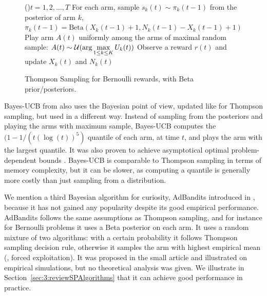 \begin{figure}[h!]
	\centering
    \begin{framed}
	\begin{algorithm}[H]
		\For(){$t = 1, 2, \dots, T$}{
            For each arm, sample $s_k(t) \sim \pi_k(t-1)$ from the posterior of arm $k$, $\pi_k(t-1)=\mathrm{Beta}(X_k(t-1)+1,N_k(t-1)-X_k(t-1)+1)$\;
            Play arm $A(t)$ uniformly among the arms of maximal random sample: $A(t) \sim \mathcal{U}(\arg\max\limits_{1\leq k \leq K} U_k(t))$\;
            Observe a reward $r(t)$ and update $X_k(t)$ and $N_k(t)$\;
		}
		\caption{Thompson Sampling for Bernoulli rewards, with Beta prior/posteriors.}
		\label{algo:2:ThompsonSampling}
	\end{algorithm}
	\end{framed}
\end{figure}


Bayes-UCB from \cite{Kaufmann12BUCB} also uses the Bayesian point of view, updated like for Thompson sampling, but used in a different way.
Instead of sampling from the posteriors and playing the arms with maximum sample, Bayes-UCB computes the $(1-1/(t (\log(t))^5)$ quantile of each arm, at time $t$, and plays the arm with the largest quantile.
It was also proven to achieve asymptotical optimal problem-dependent bounds \cite{Kaufmann12BUCB}.
%
Bayes-UCB is comparable to Thompson sampling in terms of memory complexity, but it can be slower, as computing a quantile is generally more costly than just sampling from a distribution.

We mention a third Bayesian algorithm for curiosity, AdBandits introduced in \cite{Truzzi13}, because it has not gained any popularity despite its good empirical performance.
AdBandits follows the same assumptions as Thompson sampling, and for instance for Bernoulli problems it uses a Beta posterior on each arm.
It uses a random mixture of two algorithms: with a certain probability it follows Thompson sampling decision rule, otherwise it samples the arm with highest empirical mean (\ie, forced exploitation).
It was proposed in the small article \cite{Truzzi13} and illustrated on empirical simulations, but no theoretical analysis was given.
We illustrate in Section~\ref{sec:3:reviewSPAlgorithms} that it can achieve good performance in practice.

